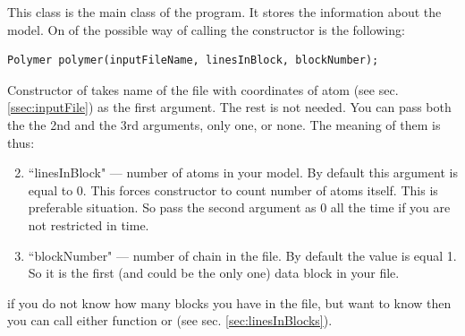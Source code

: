 \documentclass[12pt]{article}
\begin{document}
\begin{mySection}\label{sec:classPolymer}
This class is the main class of the program. It stores the information about the model.
On of the possible way of calling the constructor is the following:
\begin{lstlisting}
Polymer polymer(inputFileName, linesInBlock, blockNumber);
\end{lstlisting}

 Constructor of  takes name of the file with coordinates of atom (see sec. \ref{ssec:inputFile}) as the first argument.
 The rest is not needed. You can pass both the the 2nd and the 3rd arguments, only one, or none. The meaning of them is thus:
 \begin{enumerate}
\setcounter{enumi}{1}

\item ``linesInBlock" ---  number of atoms in your model.  By default this argument is equal to 0. This forces constructor to count number of atoms itself. This is preferable situation. So pass the second argument as 0 all the time if you are not restricted in time.

\item ``blockNumber"  --- number of chain in the file. By default the value is equal 1. So it is the first (and could be the only one) data block in your file.
 \end{enumerate}
\hint if you do not know how many blocks you have in the file, but want to know then you can call either function  or  (see sec. \ref{sec:linesInBlocks}).

\end{mySection}

\end{document}
